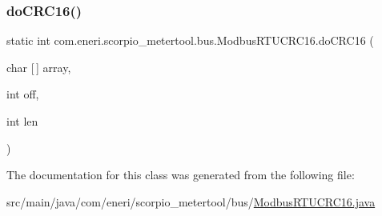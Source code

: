 \subsubsection{\texorpdfstring{do\+C\+R\+C16()}{doCRC16()}\hspace{0.1cm}{\footnotesize\ttfamily [5/5]}}
{\footnotesize\ttfamily static int com.\+eneri.\+scorpio\+\_\+metertool.\+bus.\+Modbus\+R\+T\+U\+C\+R\+C16.\+do\+C\+R\+C16 (\begin{DoxyParamCaption}\item[{char \mbox{[}$\,$\mbox{]}}]{array,  }\item[{int}]{off,  }\item[{int}]{len }\end{DoxyParamCaption})\hspace{0.3cm}{\ttfamily [static]}}



The documentation for this class was generated from the following file\+:\begin{DoxyCompactItemize}
\item 
src/main/java/com/eneri/scorpio\+\_\+metertool/bus/\hyperlink{_modbus_r_t_u_c_r_c16_8java}{Modbus\+R\+T\+U\+C\+R\+C16.\+java}\end{DoxyCompactItemize}
